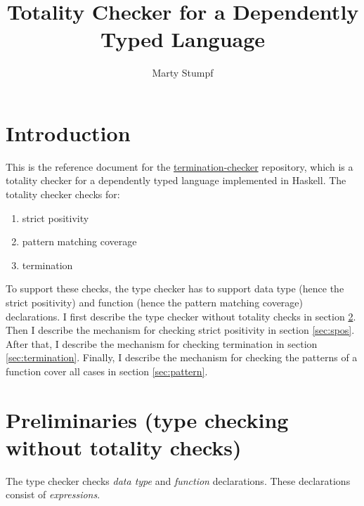 \documentclass[acmsmall]{acmart}
\begin{document}
\title{Totality Checker for a Dependently Typed Language}

%
\author{Marty Stumpf}

%

%
%
\maketitle
\thispagestyle{empty}
\section{Introduction}

This is the reference document for the
\href{https://github.com/thealmarty/termination-checker}{termination-checker}
repository, which is a totality checker for a dependently typed language
implemented in Haskell. The totality checker checks for:

\begin{enumerate}
  \item strict positivity
  \item pattern matching coverage
  \item termination
\end{enumerate}

To support these checks, the type checker has to support data type (hence the
strict positivity) and function (hence the pattern matching coverage)
declarations. I first describe the type checker without totality checks in
section \ref{sec:prelim}. Then I describe the mechanism for checking strict positivity
in section \ref{sec:spos}. After that, I describe the mechanism for checking
termination in section \ref{sec:termination}. Finally, I describe the mechanism
for checking the patterns of a function cover all cases in section
\ref{sec:pattern}.

\section{Preliminaries (type checking without totality checks)}
\label{sec:prelim}
The type checker checks \textit{data type} and \textit{function} declarations. These declarations
consist of \textit{expressions}.
\end{document}
